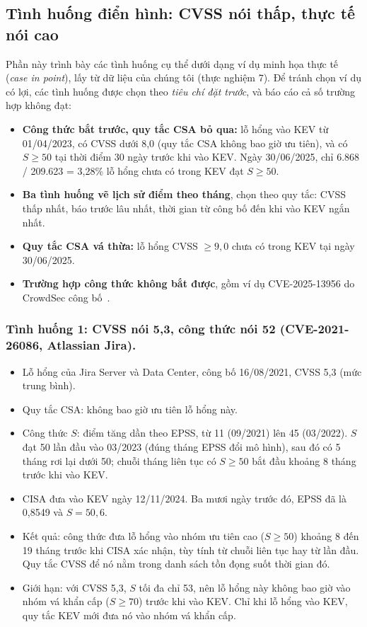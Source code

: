 \documentclass[runningheads]{llncs}
\begin{document}
\subsection{Tình huống điển hình: CVSS nói thấp, thực tế nói cao}\label{sec:tinhhuong}

Phần này trình bày các tình huống cụ thể dưới dạng ví dụ minh họa thực tế (\emph{case in point}), lấy từ
dữ liệu của chúng tôi (thực nghiệm 7). Để tránh chọn ví dụ có lợi, các tình huống được chọn theo \emph{tiêu chí
đặt trước}, và báo cáo cả số trường hợp không đạt:
\begin{itemize}
\item \textbf{Công thức bắt trước, quy tắc CSA bỏ qua:} lỗ hổng vào KEV từ 01/04/2023, có CVSS dưới 8,0 (quy
tắc CSA không bao giờ ưu tiên), và có $S \ge 50$ tại thời điểm 30 ngày trước khi vào KEV. Ngày 30/06/2025, chỉ
6.868 / 209.623 = 3,28\% lỗ hổng chưa có trong KEV đạt $S \ge 50$.
\item \textbf{Ba tình huống vẽ lịch sử điểm theo tháng}, chọn theo quy tắc: CVSS thấp nhất, báo trước lâu nhất,
thời gian từ công bố đến khi vào KEV ngắn nhất.
\item \textbf{Quy tắc CSA vá thừa:} lỗ hổng CVSS $\ge 9{,}0$ chưa có trong KEV tại ngày 30/06/2025.
\item \textbf{Trường hợp công thức không bắt được}, gồm ví dụ CVE-2025-13956 do CrowdSec công bố~\cite{crowdsec2026}.
\end{itemize}

\subsubsection{Tình huống 1: CVSS nói 5,3, công thức nói 52 (CVE-2021-26086, Atlassian Jira).}
\begin{itemize}
\item Lỗ hổng của Jira Server và Data Center, công bố 16/08/2021, CVSS 5,3 (mức trung bình).
\item Quy tắc CSA: không bao giờ ưu tiên lỗ hổng này.
\item Công thức $S$: điểm tăng dần theo EPSS, từ 11 (09/2021) lên 45 (03/2022). $S$ đạt 50 lần đầu vào
03/2023 (đúng tháng EPSS đổi mô hình), sau đó có 5 tháng rơi lại dưới 50; chuỗi tháng liên tục có $S \ge 50$ bắt đầu khoảng
8 tháng trước khi vào KEV.
\item CISA đưa vào KEV ngày 12/11/2024. Ba mươi ngày trước đó, EPSS đã là 0,8549 và $S = 50{,}6$.
\item Kết quả: công thức đưa lỗ hổng vào nhóm ưu tiên cao ($S \ge 50$) khoảng 8 đến 19 tháng trước khi CISA
xác nhận, tùy tính từ chuỗi liên tục hay từ lần đầu. Quy tắc CVSS để nó nằm trong danh sách tồn đọng suốt thời
gian đó.
\item Giới hạn: với CVSS 5,3, $S$ tối đa chỉ 53, nên lỗ hổng này không bao giờ vào nhóm vá khẩn cấp
($S \ge 70$) trước khi vào KEV. Chỉ khi lỗ hổng vào KEV, quy tắc KEV mới đưa nó vào nhóm vá khẩn cấp.
\end{itemize}
\end{document}
